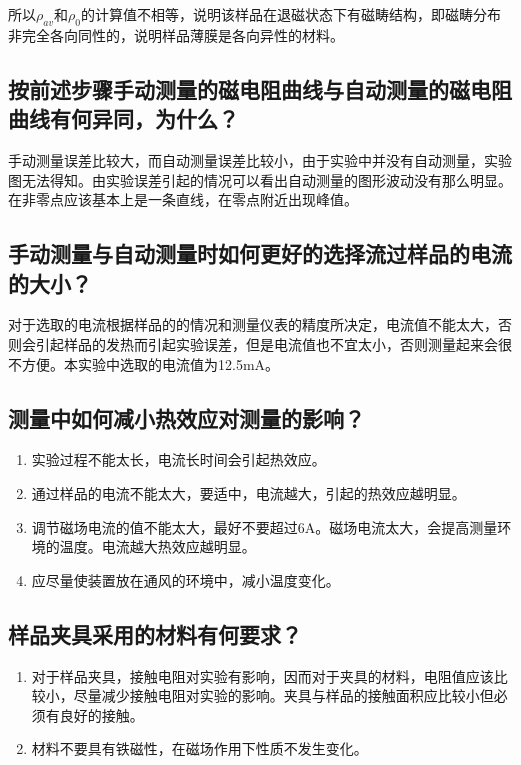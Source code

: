 \documentclass[a4paper]{article}
\begin{document}
所以$\rho_{av}$和$\rho_0$的计算值不相等，说明该样品在退磁状态下有磁畴结构，即磁畴分布非完全各向同性的，说明样品薄膜是各向异性的材料。
\subsection{按前述步骤手动测量的磁电阻曲线与自动测量的磁电阻曲线有何异同，为什么？}
手动测量误差比较大，而自动测量误差比较小，由于实验中并没有自动测量，实验图无法得知。由实验误差引起的情况可以看出自动测量的图形波动没有那么明显。在非零点应该基本上是一条直线，在零点附近出现峰值。
\subsection{手动测量与自动测量时如何更好的选择流过样品的电流的大小？}
对于选取的电流根据样品的的情况和测量仪表的精度所决定，电流值不能太大，否则会引起样品的发热而引起实验误差，但是电流值也不宜太小，否则测量起来会很不方便。本实验中选取的电流值为12.5mA。
\subsection{测量中如何减小热效应对测量的影响？}
\begin{enumerate}
	\item 实验过程不能太长，电流长时间会引起热效应。
	\item 通过样品的电流不能太大，要适中，电流越大，引起的热效应越明显。
	\item 调节磁场电流的值不能太大，最好不要超过6A。磁场电流太大，会提高测量环境的温度。电流越大热效应越明显。
	\item 应尽量使装置放在通风的环境中，减小温度变化。
\end{enumerate}
\subsection{样品夹具采用的材料有何要求？}
\begin{enumerate}
	\item 对于样品夹具，接触电阻对实验有影响，因而对于夹具的材料，电阻值应该比较小，尽量减少接触电阻对实验的影响。夹具与样品的接触面积应比较小但必须有良好的接触。
	\item 材料不要具有铁磁性，在磁场作用下性质不发生变化。
\end{enumerate}

\nocite{jiaocai}

\end{document}
